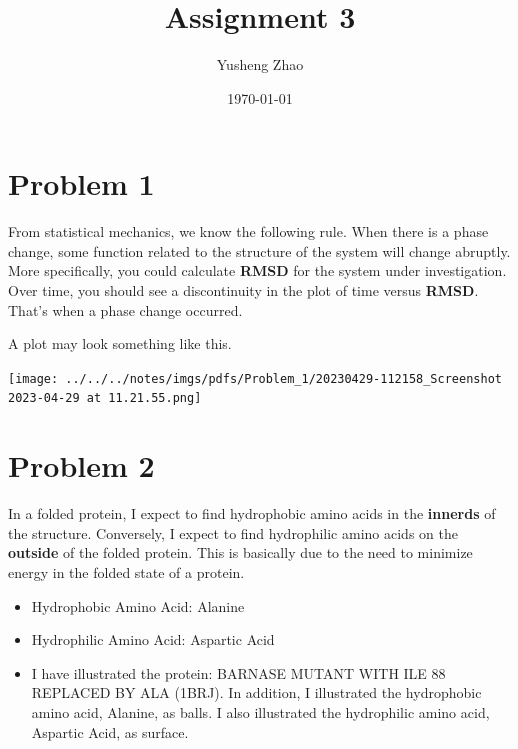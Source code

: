 \documentclass[11pt]{article}
\author{Yusheng Zhao}
\date{\today}
\title{Assignment 3}
\begin{document}
\maketitle


\section{Problem 1}
\label{sec:org81370df}
From statistical mechanics, we know the following rule. When there is a phase
change, some function related to the structure of the system will change
abruptly. More specifically, you could calculate \textbf{RMSD} for the system under
investigation. Over time, you should see a discontinuity in the plot of time
versus \textbf{RMSD}. That's when a phase change occurred.

A plot may look something like this.

\begin{center}
\texttt{[image: ../../../notes/imgs/pdfs/Problem\_1/20230429-112158\_Screenshot 2023-04-29 at 11.21.55.png]}
\end{center}

\section{Problem 2}
\label{sec:org269a7c0}
In a folded protein, I expect to find hydrophobic amino acids in the \textbf{innerds}
of the structure. Conversely, I expect to find hydrophilic amino acids on the
\textbf{outside} of the folded protein. This is basically due to the need to minimize
energy in the folded state of a protein.

\begin{itemize}
\item Hydrophobic Amino Acid: Alanine
\item Hydrophilic Amino Acid: Aspartic Acid
\item I have illustrated the protein: BARNASE MUTANT WITH ILE 88 REPLACED BY ALA
(1BRJ). In addition, I illustrated the hydrophobic amino acid, Alanine, as
balls. I also illustrated the hydrophilic amino acid, Aspartic Acid, as
surface.
\end{itemize}
\end{document}
